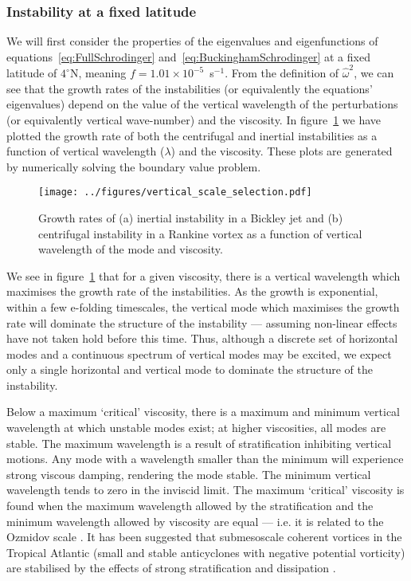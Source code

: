\subsubsection{Instability at a fixed latitude}
We will first consider the properties of the eigenvalues and eigenfunctions of equations~\ref{eq:FullSchrodinger} and~\ref{eq:BuckinghamSchrodinger} at a fixed latitude of $4^\circ$N, meaning $f = 1.01 \times 10^{-5}$~s$^{-1}$. From the definition of $\hat{\omega}^2$, we can see that the growth rates of the instabilities (or equivalently the equations' eigenvalues) depend on the value of the vertical wavelength of the perturbations (or equivalently vertical wave-number) and the viscosity. In figure~\ref{fig:DispersionRelation} we have plotted the growth rate of both the centrifugal and inertial instabilities as a function of vertical wavelength ($\lambda$) and the viscosity. These plots are generated by numerically solving the boundary value problem.


\begin{figure}[t]
    \centering
    \texttt{[image: ../figures/vertical\_scale\_selection.pdf]}
    \caption{Growth rates of (a) inertial instability in a Bickley jet and (b) centrifugal instability in a Rankine vortex as a function of vertical wavelength of the mode and viscosity.}
    \label{fig:DispersionRelation}
\end{figure}
We see in figure~\ref{fig:DispersionRelation} that for a given viscosity, there is a vertical wavelength which maximises the growth rate of the instabilities. As the growth is exponential, within a few e-folding timescales, the vertical mode which maximises the growth rate will dominate the structure of the instability --- assuming non-linear effects have not taken hold before this time. Thus, although a discrete set of horizontal modes and a continuous spectrum of vertical modes may be excited, we expect only a single horizontal and vertical mode to dominate the structure of the instability.

Below a maximum `critical' viscosity, there is a maximum and minimum vertical wavelength at which unstable modes exist; at higher viscosities, all modes are stable. The maximum wavelength is a result of stratification inhibiting vertical motions. Any mode with a wavelength smaller than the minimum will experience strong viscous damping, rendering the mode stable. The minimum vertical wavelength tends to zero in the inviscid limit. The maximum `critical' viscosity is found when the maximum wavelength allowed by the stratification and the minimum wavelength allowed by viscosity are equal --- i.e. it is related to the Ozmidov scale \citep{Ozmidov1965, OzmidovAMS}. It has been suggested that submesoscale coherent vortices in the Tropical Atlantic (small and stable anticyclones with negative potential vorticity) are stabilised by the effects of strong stratification and dissipation \citep{Simoes-sousa2021}.


